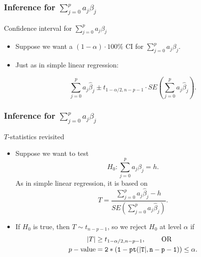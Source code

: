 \documentclass[handout]{beamer}
\begin{document}

   \begin{frame} \frametitle{Inference for $\sum_{j=0}^p a_j \beta_j$}

   \begin{block}
   {Confidence interval for $\sum_{j=0}^p a_j \beta_j$}
   \begin{itemize}
   \item Suppose we want  a $(1-\alpha)\cdot 100\%$ CI for $\sum_{j=0}^p a_j\beta_j$.

   \item Just as in simple linear regression:

   $$
   \sum_{j=0}^p a_j \widehat{\beta}_j \pm t_{1-\alpha/2, n-p-1} \cdot SE\left(\sum_{j=0}^p a_j\widehat{\beta}_j\right).$$
   \end{itemize}
   \end{block}
   \end{frame}


   \begin{frame} \frametitle{Inference for $\sum_{j=0}^p a_j \beta_j$}

   \begin{block}
   {$T$-statistics revisited}
   \begin{itemize}
   \item Suppose we want to test
   $$H_0:\sum_{j=0}^p a_j\beta_j= h.$$ As in simple linear regression, it is based on
   $$
   T = \frac{\sum_{j=0}^p a_j \widehat{\beta}_j - h}{SE(\sum_{j=0}^p a_j \widehat{\beta}_j)}.$$
   \item If $H_0$ is true, then $T \sim t_{n-p-1}$, so we reject
   $H_0$ at level $\alpha$ if
   $$
   \begin{aligned}
   |T| &\geq t_{1-\alpha/2,n-p-1}, \qquad \text{ OR} \\
   p-\text{value} &= {\tt 2*(1-pt(|T|, n-p-1))} \leq \alpha.
   \end{aligned}
   $$
   \end{itemize}
   \end{block}
   \end{frame}

\end{document}
